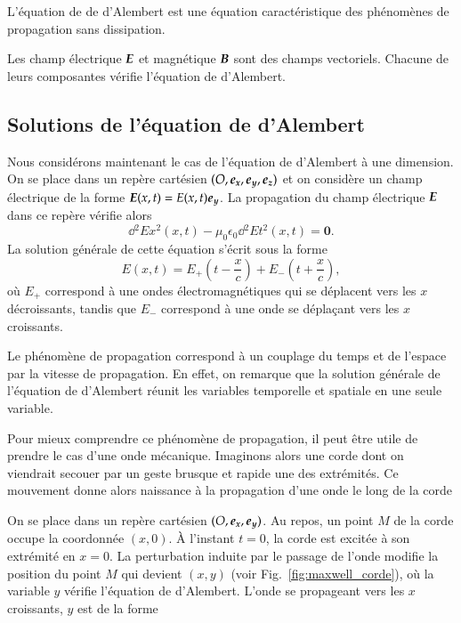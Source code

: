 \begin{rema}
	L'équation de de d'Alembert est une équation caractéristique des phénomènes
	de propagation sans dissipation.
\end{rema}

Les champ électrique $\vece$ et magnétique $\vecb$ sont des champs vectoriels.
Chacune de leurs composantes vérifie l'équation de d'Alembert.

\subsection{Solutions de l'équation de d'Alembert}
Nous considérons maintenant le cas de l'équation de d'Alembert à une dimension.
On se place dans un repère cartésien $(O, \ex, \ey, \ez)$ et on considère
un champ électrique de la forme $\vece(x, t) = E(x, t)\ey$.
La propagation du champ électrique $\vece$ dans ce repère vérifie alors 
\begin{equation*}
	\dd{^2 E}{x^2}(x, t) - \mu_0 \epsilon_0 \dd{^2 E}{t^2}(x, t) = \mathbf{0}.
\end{equation*}
La solution générale de cette équation s'écrit sous la forme
\begin{equation*}
	E(x, t) = E_+\left(t - \frac{x}{c}\right) + E_- \left(t + \frac{x}{c}\right),
\end{equation*}
où $E_+$ correspond à une ondes électromagnétiques qui se déplacent vers 
les $x$ décroissants, tandis que $E_-$ correspond à une onde se déplaçant vers 
les $x$ croissants.

\begin{rema}
	Le phénomène de propagation correspond à un couplage du temps et 
	de l'espace par la vitesse de propagation. En effet, on remarque que 
	la solution générale de l'équation de d'Alembert réunit les variables
	temporelle et spatiale en une seule variable.
\end{rema}

Pour mieux comprendre ce phénomène de propagation, il peut être utile de prendre
le cas d'une onde mécanique. Imaginons alors une corde dont on viendrait secouer par un
geste brusque et rapide une des extrémités. Ce mouvement donne alors naissance
à la propagation d'une onde le long de la corde


On se place dans un repère cartésien $(O, \ex, \ey)$. 
 Au repos, un point $M$ de la corde occupe la coordonnée $(x, 0)$.
À l'instant $t = 0$, la corde est excitée à son extrémité en 
$x = 0$. La perturbation induite par le passage de l'onde modifie la position
du point $M$ qui devient $(x, y)$ (voir Fig.~\ref{fig:maxwell_corde}), 
où la variable $y$ vérifie l'équation de 
d'Alembert. L'onde se propageant vers les $x$ croissants, $y$ est de la forme

